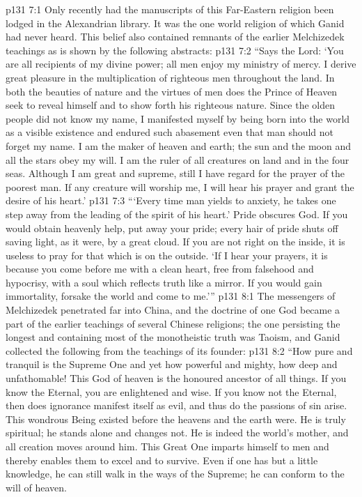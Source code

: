 \vs p131 7:1 Only recently had the manuscripts of this Far\hyp{}Eastern religion been lodged in the Alexandrian library. It was the one world religion of which Ganid had never heard. This belief also contained remnants of the earlier Melchizedek teachings as is shown by the following abstracts:
\vs p131 7:2 \pc “Says the Lord: ‘You are all recipients of my divine power; all men enjoy my ministry of mercy. I derive great pleasure in the multiplication of righteous men throughout the land. In both the beauties of nature and the virtues of men does the Prince of Heaven seek to reveal himself and to show forth his righteous nature. Since the olden people did not know my name, I manifested myself by being born into the world as a visible existence and endured such abasement even that man should not forget my name. I am the maker of heaven and earth; the sun and the moon and all the stars obey my will. I am the ruler of all creatures on land and in the four seas. Although I am great and supreme, still I have regard for the prayer of the poorest man. If any creature will worship me, I will hear his prayer and grant the desire of his heart.’
\vs p131 7:3 “‘Every time man yields to anxiety, he takes one step away from the leading of the spirit of his heart.’ Pride obscures God. If you would obtain heavenly help, put away your pride; every hair of pride shuts off saving light, as it were, by a great cloud. If you are not right on the inside, it is useless to pray for that which is on the outside. ‘If I hear your prayers, it is because you come before me with a clean heart, free from falsehood and hypocrisy, with a soul which reflects truth like a mirror. If you would gain immortality, forsake the world and come to me.’”
\vs p131 8:1 The messengers of Melchizedek penetrated far into China, and the doctrine of one God became a part of the earlier teachings of several Chinese religions; the one persisting the longest and containing most of the monotheistic truth was Taoism, and Ganid collected the following from the teachings of its founder:
\vs p131 8:2 \pc “How pure and tranquil is the Supreme One and yet how powerful and mighty, how deep and unfathomable! This God of heaven is the honoured ancestor of all things. If you know the Eternal, you are enlightened and wise. If you know not the Eternal, then does ignorance manifest itself as evil, and thus do the passions of sin arise. This wondrous Being existed before the heavens and the earth were. He is truly spiritual; he stands alone and changes not. He is indeed the world’s mother, and all creation moves around him. This Great One imparts himself to men and thereby enables them to excel and to survive. Even if one has but a little knowledge, he can still walk in the ways of the Supreme; he can conform to the will of heaven.
